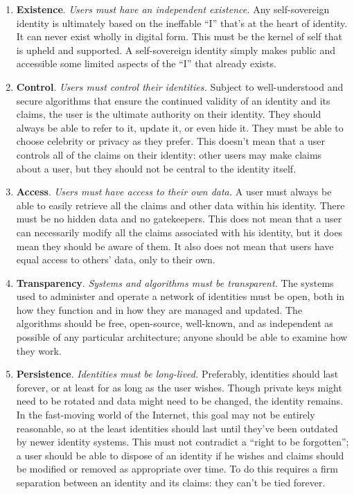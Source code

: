 \documentclass[twoside]{article}
\begin{document}
\begin{enumerate}
  \item \textbf{Existence}. \emph{Users must have an independent existence.} Any self-sovereign identity is ultimately based on the ineffable “I” that’s at the heart of identity. It can never exist wholly in digital form. This must be the kernel of self that is upheld and supported. A self-sovereign identity simply makes public and accessible some limited aspects of the “I” that already exists.
  \item \textbf{Control}. \emph{Users must control their identities.} Subject to well-understood and secure algorithms that ensure the continued validity of an identity and its claims, the user is the ultimate authority on their identity. They should always be able to refer to it, update it, or even hide it. They must be able to choose celebrity or privacy as they prefer. This doesn’t mean that a user controls all of the claims on their identity: other users may make claims about a user, but they should not be central to the identity itself.
  \item \textbf{Access}. \emph{Users must have access to their own data.} A user must always be able to easily retrieve all the claims and other data within his identity. There must be no hidden data and no gatekeepers. This does not mean that a user can necessarily modify all the claims associated with his identity, but it does mean they should be aware of them. It also does not mean that users have equal access to others’ data, only to their own.
  \item \textbf{Transparency}. \emph{Systems and algorithms must be transparent.} The systems used to administer and operate a network of identities must be open, both in how they function and in how they are managed and updated. The algorithms should be free, open-source, well-known, and as independent as possible of any particular architecture; anyone should be able to examine how they work.
  \item \textbf{Persistence}. \emph{Identities must be long-lived.} Preferably, identities should last forever, or at least for as long as the user wishes. Though private keys might need to be rotated and data might need to be changed, the identity remains. In the fast-moving world of the Internet, this goal may not be entirely reasonable, so at the least identities should last until they’ve been outdated by newer identity systems. This must not contradict a “right to be forgotten”; a user should be able to dispose of an identity if he wishes and claims should be modified or removed as appropriate over time. To do this requires a firm separation between an identity and its claims: they can’t be tied forever.

\end{enumerate}
\end{document}
